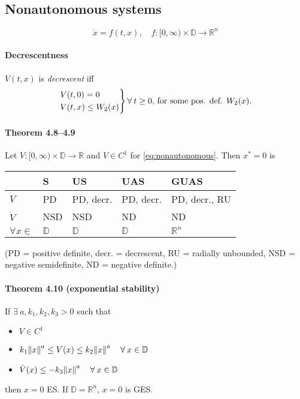 \subsection{Nonautonomous systems}
\begin{equation}\label{eq:nonautonomous}
	\dot{x} = f(t,x), \quad f : [0,\infty) \times \mathbb{D} \to \mathbb{R}^n
\end{equation}

\paragraph{Decrescentness}
$V(t,x)$ is \emph{decrescent} iff
\begin{equation}
	\begin{rcases}
		V(t,0) =    0      \\
		V(t,x) \leq W_2(x)
	\end{rcases}
	\forall \: t \geq 0
	\mbox{, for some pos. def. }
	W_2(x).
\end{equation}

\paragraph{Theorem 4.8--4.9}
Let $V : [0,\infty) \times \mathbb{D} \to \mathbb{R}$ and $V \in C^1$ for \eqref{eq:nonautonomous}. Then $x^* = 0$ is
\begin{center}
	\begin{tabular}{lllll}
		& S & US & UAS & GUAS \\
		\hline
		$V$ & PD & PD, decr. & PD, decr. & PD, decr., RU \\
		$\dot{V}$ & NSD & NSD & ND & ND \\
		$\forall x \in$ & $\mathbb{D}$ & $\mathbb{D}$ & $\mathbb{D}$ & $\mathbb{R}^n$
	\end{tabular}
\end{center}
(PD = positive definite, decr. = decrescent, RU = radially unbounded, NSD = negative semidefinite, ND = negative definite.)

\paragraph{Theorem 4.10 (exponential stability)}
If $\exists \: a, k_1, k_2, k_3 > 0$ such that
\begin{itemize}
	\item $V \in C^1$
	\item $k_1 \norm{x}^a \leq V(x) \leq k_2 \norm{x}^a \quad \forall \: x \in \mathbb{D}$
	\item $\dot{V}(x) \leq - k_3 \norm{x}^a \quad \forall \: x \in \mathbb{D}$
\end{itemize}
then $x = 0$ ES. If $\mathbb{D} = \mathbb{R}^n$, $x = 0$ is GES.

